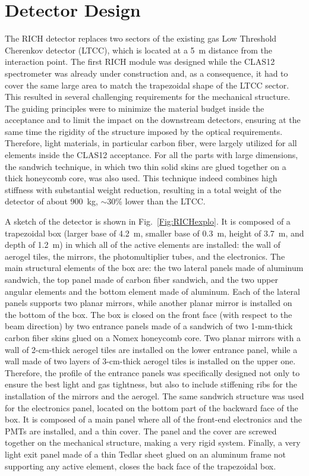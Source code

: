 \documentclass[5p,times,twocolumn]{elsarticle}
\begin{document}
\section{Detector Design}

The RICH detector replaces two sectors of the existing gas Low Threshold Cherenkov detector (LTCC), which is located
at a 5~m distance from the interaction point. The first RICH module was designed while the CLAS12 spectrometer was
already under construction and,  as a consequence, it had to cover the same large area to match the trapezoidal shape of
the LTCC sector. This resulted in several challenging requirements for the mechanical structure. The guiding principles
were to minimize the material budget inside the acceptance and to limit the impact on the downstream detectors,
ensuring at the same time the rigidity of the structure imposed by the optical requirements. Therefore, light materials,
in particular carbon fiber, were largely utilized for all elements inside the CLAS12 acceptance. For all the parts with
large dimensions, the sandwich technique, in which two thin solid skins are glued together on a thick honeycomb core, was
also used. This technique indeed combines high stiffness with substantial weight reduction, resulting in a total weight of
the detector of about 900~kg, $\sim$30\% lower than the LTCC.

A sketch of the detector is shown in Fig.~\ref{Fig:RICHexplo}. It is composed of a trapezoidal box (larger base of
4.2~m, smaller base of 0.3~m, height of 3.7~m, and depth of 1.2~m) in which all of the active elements are installed:
the wall of aerogel tiles, the mirrors, the photomultiplier tubes, and the electronics. The main structural elements of
the box are: the two lateral panels made of aluminum sandwich, the top panel made of carbon fiber sandwich, and the
two upper angular elements and the bottom element made of aluminum. Each of the lateral panels supports two planar
mirrors, while another planar mirror is installed on the bottom of the box. The box is closed on the front face (with
respect to the beam direction) by two entrance panels made of a sandwich of two 1-mm-thick carbon fiber skins glued on a
Nomex honeycomb core. Two planar mirrors with a wall of 2-cm-thick aerogel tiles are installed on the lower entrance panel, while
a wall made of two layers of 3-cm-thick aerogel tiles is installed on the upper one. Therefore, the profile of the entrance panels
was specifically designed not only to ensure the best light and gas tightness, but also to include stiffening ribs for
the installation of the mirrors and the aerogel. The same sandwich structure was used for the electronics panel, located
on the bottom part of the backward face of the box. It is composed of a main panel where all of the front-end electronics
and the PMTs are installed, and a thin cover. The panel and the cover are screwed together on the mechanical
structure, making a very rigid system. Finally, a very light exit panel made of a thin Tedlar sheet glued on an aluminum
frame not supporting any active element, closes the back face of the trapezoidal box. 
\end{document}
